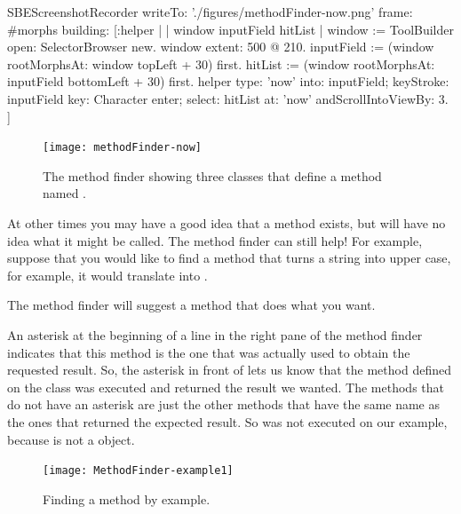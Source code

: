 \documentclass[a4paper,10pt,twoside]{book}
\begin{document}
\begin{ExecuteSmalltalkScript}
SBEScreenshotRecorder writeTo: './figures/methodFinder-now.png' frame: #morphs building: [:helper |
	| window inputField hitList |
	window := ToolBuilder open: SelectorBrowser new.
	window extent: 500 @ 210.
	inputField := (window rootMorphsAt: window topLeft + 30) first.
	hitList := (window rootMorphsAt: inputField bottomLeft + 30) first.
	helper
		type: 'now' into: inputField;
		keyStroke: inputField key: Character enter;
		select: hitList at: 'now' andScrollIntoViewBy: 3.
]
\end{ExecuteSmalltalkScript}

\begin{figure}[hbt]
\centerline {\texttt{[image: methodFinder-now]}}
\caption{The method finder showing three classes that define a method named .
\label{fig:MethodFinder}}
\end{figure}

At other times you may have a good idea that a method exists, but will have no idea what it might be called.
The method finder can still help!
For example, suppose that you would like to find a method that turns a string into upper case, for example, it would translate  into .

\noindent
The method finder will suggest a method that does what you want.

An asterisk at the beginning of a line in the right pane of the method finder indicates that this method is the one that was actually used to obtain the requested result.
So, the asterisk in front of  lets us know that the method  defined on the class  was executed and returned the result we wanted.
The methods that do not have an asterisk are just the other methods that have the same name as the ones that returned the expected result.
So  was not executed on our example, because  is not a  object.

\begin{figure}[hbt]
\centerline {\texttt{[image: MethodFinder-example1]}}
\caption{Finding a method by example.
\label{fig:methodFinder-example1}}
\end{figure}
\end{document}
